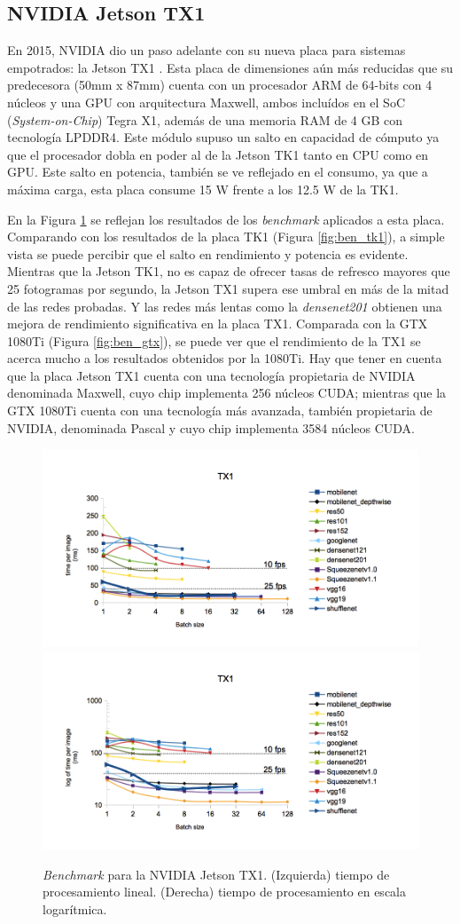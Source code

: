 \subsection{NVIDIA Jetson TX1}

En 2015, NVIDIA dio un paso adelante con su nueva placa para sistemas empotrados: la Jetson TX1 \cite{jetsontx1}. Esta placa de dimensiones aún más reducidas que su predecesora (50mm x 87mm) cuenta con un procesador ARM de 64-bits con 4 núcleos y una GPU con arquitectura Maxwell, ambos incluídos en el SoC (\textit{System-on-Chip}) Tegra X1, además de una memoria RAM de 4 GB con tecnología LPDDR4. Este módulo supuso un salto en capacidad de cómputo ya que el procesador dobla en poder al de la Jetson TK1 tanto en CPU como en GPU. Este salto en potencia, también se ve reflejado en el consumo, ya que a máxima carga, esta placa consume 15 W frente a los 12.5 W de la TK1.

En la Figura \ref{fig:ben_tx1} se reflejan los resultados de los \textit{benchmark} aplicados a esta placa. Comparando con los resultados de la placa TK1 (Figura \ref{fig:ben_tk1}), a simple vista se puede percibir que el salto en rendimiento y potencia es evidente. Mientras que la Jetson TK1, no es capaz de ofrecer tasas de refresco mayores que 25 fotogramas por segundo, la Jetson TX1 supera ese umbral en más de la mitad de las redes probadas. Y las redes más lentas como la \textit{densenet201} obtienen una mejora de rendimiento significativa en la placa TX1.
Comparada con la GTX 1080Ti (Figura \ref{fig:ben_gtx}), se puede ver que el rendimiento de la TX1 se acerca mucho a los resultados obtenidos por la 1080Ti. Hay que tener en cuenta que la placa Jetson TX1 cuenta con una tecnología propietaria de NVIDIA denominada Maxwell, cuyo chip implementa 256 núcleos CUDA; mientras que la GTX 1080Ti cuenta con una tecnología más avanzada, también propietaria de NVIDIA, denominada Pascal y cuyo chip implementa 3584 núcleos CUDA.

\begin{figure}[htp]
    \centering
    \captionsetup{justification=centering}
    \includegraphics[width=.5\textwidth]{img/TX1_linear.png}\hfill
    \includegraphics[width=.5\textwidth]{img/TX1_log.png}
    \caption{\textit{Benchmark} para la NVIDIA Jetson TX1. (Izquierda) tiempo de procesamiento lineal. (Derecha) tiempo de procesamiento en escala logarítmica.}
    \label{fig:ben_tx1}
\end{figure}

